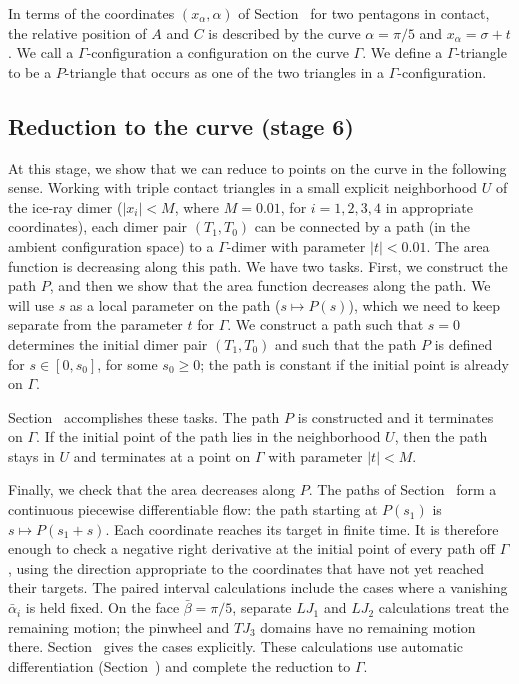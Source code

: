 In terms of the coordinates $(x_\alpha,\alpha)$ of
Section~ for two pentagons in contact, the relative
position of $A$ and $C$ is described by the curve $\alpha=\pi/5$ and
$x_\alpha = \sigma+t$.  We call a $\Gamma$-configuration a
configuration on the curve $\Gamma$.  We define a $\Gamma$-triangle to
be a $P$-triangle that occurs as one of the two triangles in a
$\Gamma$-configuration.

\subsection{Reduction to the curve (stage 6)}

At this stage, we show that we can reduce to points on the curve in
the following sense.  Working with triple contact triangles in a small
explicit neighborhood $U$ of the ice-ray dimer ($|x_i|<M$, where
$M=0.01$, for $i=1,2,3,4$ in appropriate coordinates), each dimer pair
$(T_1,T_0)$ can be connected by a path (in the ambient configuration
space) to a $\Gamma$-dimer with parameter $|t|<0.01$.  The area
function is decreasing along this path.  We have two tasks.  First, we
construct the path $P$, and then we show that the area function
decreases along the path.  We will use $s$ as a local parameter on the
path ($s\mapsto P(s)$), which we need to keep separate from the
parameter $t$ for $\Gamma$.  We construct a path such that $s=0$
determines the initial dimer pair $(T_1,T_0)$ and such that the path
$P$ is defined for $s\in [0,s_0]$, for some $s_0\ge0$; the path is
constant if the initial point is already on $\Gamma$.

Section~ accomplishes these tasks.  The path $P$ is
constructed and it terminates on $\Gamma$.  If the initial point of
the path lies in the neighborhood $U$, then the path stays in $U$
and terminates at a point on $\Gamma$ with parameter $|t|<M$.

Finally, we check that the area decreases along $P$. The paths of
Section~ form a continuous piecewise differentiable
flow: the path starting at $P(s_1)$ is $s\mapsto P(s_1+s)$.
Each coordinate reaches its target in finite time. It is therefore
enough to check a negative right derivative at the initial point of
every path off $\Gamma$, using the direction appropriate to the
coordinates that have not yet reached their targets. The paired
interval calculations include the cases where a vanishing
$\bar\alpha_i$ is held fixed. On the face $\bar\beta=\pi/5$,
separate $LJ_1$ and $LJ_2$ calculations treat the remaining motion;
the pinwheel and $TJ_3$ domains have no remaining motion there.
Section~ gives the cases explicitly. These
calculations use automatic differentiation
(Section~) and complete the reduction to
$\Gamma$.

